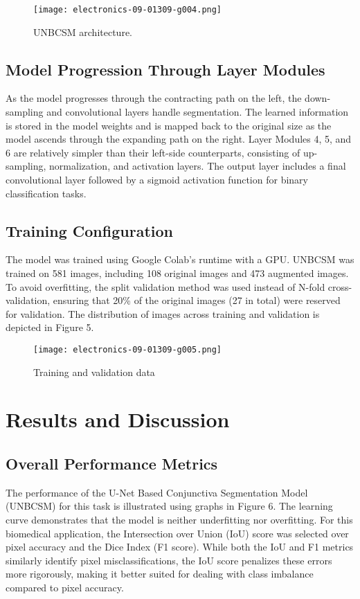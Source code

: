 \documentclass[conference]{IEEEtran}
\begin{document}
\begin{figure}[htbp]
\centerline{\texttt{[image: electronics-09-01309-g004.png]}}
\caption{UNBCSM architecture.}
\label{fig}
\end{figure}

\subsection{\textbf{Model Progression Through Layer Modules}}
As the model progresses through the contracting path on the left, the down-sampling and convolutional layers handle segmentation. The learned information is stored in the model weights and is mapped back to the original size as the model ascends through the expanding path on the right. Layer Modules 4, 5, and 6 are relatively simpler than their left-side counterparts, consisting of up-sampling, normalization, and activation layers. The output layer includes a final convolutional layer followed by a sigmoid activation function for binary classification tasks.

\subsection{\textbf{Training Configuration}}
The model was trained using Google Colab's runtime with a GPU. UNBCSM was trained on 581 images, including 108 original images and 473 augmented images. To avoid overfitting, the split validation method was used instead of N-fold cross-validation, ensuring that 20\% of the original images (27 in total) were reserved for validation. The distribution of images across training and validation is depicted in Figure 5.

\begin{figure}[htbp]
\centerline{\texttt{[image: electronics-09-01309-g005.png]}}
\caption{Training and validation data}
\label{fig}
\end{figure}

\section{\textbf{Results and Discussion}}

\subsection{\textbf{Overall Performance Metrics}}
The performance of the U-Net Based Conjunctiva Segmentation Model (UNBCSM) for this task is illustrated using graphs in Figure 6. The learning curve demonstrates that the model is neither underfitting nor overfitting. For this biomedical application, the Intersection over Union (IoU) score was selected over pixel accuracy and the Dice Index (F1 score). While both the IoU and F1 metrics similarly identify pixel misclassifications, the IoU score penalizes these errors more rigorously, making it better suited for dealing with class imbalance compared to pixel accuracy.
\end{document}
